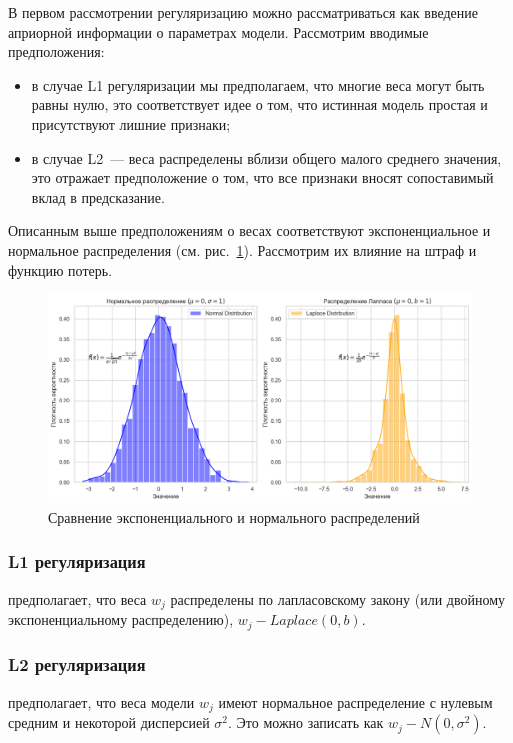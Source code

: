 В первом рассмотрении регуляризацию можно рассматриваться как введение априорной информации о параметрах модели. Рассмотрим вводимые предположения:
\begin{itemize}
	\item в случае L1 регуляризации мы предполагаем, что многие веса могут быть равны нулю, это соответствует идее о том, что истинная модель простая и присутствуют лишние признаки;
	\item в случае L2~--- веса распределены вблизи общего малого среднего значения, это отражает предположение о том, что все признаки вносят сопоставимый вклад в предсказание.
\end{itemize}
\noindent
Описанным выше предположениям о весах соответствуют экспоненциальное и нормальное распределения (см. рис.~\ref{linear-reg-distribution}). Рассмотрим их влияние на штраф и функцию потерь.

\begin{figure}[h]
	\centering
	\includegraphics[width=0.9\linewidth]{chapters/linear/pics/reg-distributions.png}
	\caption{Сравнение экспоненциального и нормального распределений}
	\label{linear-reg-distribution}
\end{figure}

\subsubsection {L1 регуляризация}

предполагает, что веса $w_j$ распределены по лапласовскому закону (или двойному экспоненциальному распределению), $w_j - Laplace(0, b)$.

\subsubsection{L2 регуляризация}

предполагает, что веса модели $w_j$ имеют нормальное распределение с нулевым средним и некоторой дисперсией $\sigma^2$. Это можно записать как $w_j - N(0, \sigma^2)$.

